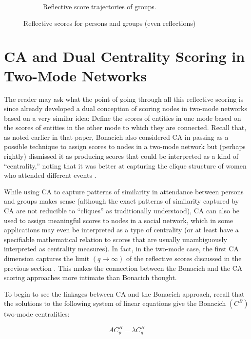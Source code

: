 \documentclass[a4paper,fleqn]{cas-sc}
\begin{document}
\begin{figure}[ht!]
\begin{subfigure}[b]{0.45\textwidth}
            \caption{Reflective score trajectories of groups.}
            \label{fig:g-refs}
    \end{subfigure}
    \caption{Reflective scores for persons and groups (even reflections)}
    \label{fig:refs}
\end{figure}

\section{CA and Dual Centrality Scoring in Two-Mode Networks} \label{sec:ca}
The reader may ask what the point of going through all this reflective scoring is since \citet{bonacich1991simultaneous} already developed a dual conception of scoring nodes in two-mode networks based on a very similar idea: Define the scores of entities in one mode based on the scores of entities in the other mode to which they are connected. Recall that, as noted earlier in that paper, Bonacich also considered CA in passing as a possible technique to assign scores to nodes in a two-mode network but (perhaps rightly) dismissed it as producing scores that could be interpreted as a kind of ``centrality,'' noting that it was better at capturing the clique structure of women who attended different events \citeyearpar[164]{bonacich1991simultaneous}. 

While using CA to capture patterns of similarity in attendance between persons and groups makes sense (although the exact patterns of similarity captured by CA are not reducible to ``cliques'' as traditionally understood), CA can also be used to assign meaningful scores to nodes in a social network, which in some applications may even be interpreted as a type of centrality (or at least have a specifiable mathematical relation to scores that are usually unambiguously interpreted as centrality measures). In fact, in the two-mode case, the first CA dimension captures the limit $(q \rightarrow \infty)$ of the reflective scores discussed in the previous section \citep{mealy2019interpreting}. This makes the connection between the Bonacich and the CA scoring approaches more intimate than Bonacich thought. 

To begin to see the linkages between CA and the Bonacich approach, recall that the solutions to the following system of linear equations give the Bonacich $(C^B)$ two-mode centralities:

\begin{equation}
    AC^B_p = \lambda C^B_g 
    \label{eq:bon1}
\end{equation}
\end{document}
